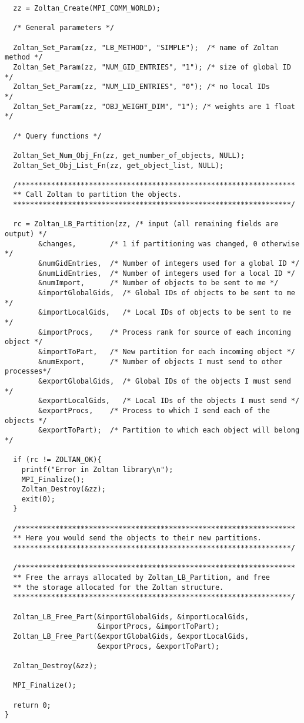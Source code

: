 \begin{flushleft}
\begin{verbatim}
  zz = Zoltan_Create(MPI_COMM_WORLD);

  /* General parameters */

  Zoltan_Set_Param(zz, "LB_METHOD", "SIMPLE");  /* name of Zoltan method */
  Zoltan_Set_Param(zz, "NUM_GID_ENTRIES", "1"); /* size of global ID    */
  Zoltan_Set_Param(zz, "NUM_LID_ENTRIES", "0"); /* no local IDs         */
  Zoltan_Set_Param(zz, "OBJ_WEIGHT_DIM", "1"); /* weights are 1 float   */

  /* Query functions */

  Zoltan_Set_Num_Obj_Fn(zz, get_number_of_objects, NULL);
  Zoltan_Set_Obj_List_Fn(zz, get_object_list, NULL);

  /******************************************************************
  ** Call Zoltan to partition the objects.
  ******************************************************************/

  rc = Zoltan_LB_Partition(zz, /* input (all remaining fields are output) */
        &changes,        /* 1 if partitioning was changed, 0 otherwise */ 
        &numGidEntries,  /* Number of integers used for a global ID */
        &numLidEntries,  /* Number of integers used for a local ID */
        &numImport,      /* Number of objects to be sent to me */
        &importGlobalGids,  /* Global IDs of objects to be sent to me */
        &importLocalGids,   /* Local IDs of objects to be sent to me */
        &importProcs,    /* Process rank for source of each incoming object */
        &importToPart,   /* New partition for each incoming object */
        &numExport,      /* Number of objects I must send to other processes*/
        &exportGlobalGids,  /* Global IDs of the objects I must send */
        &exportLocalGids,   /* Local IDs of the objects I must send */
        &exportProcs,    /* Process to which I send each of the objects */
        &exportToPart);  /* Partition to which each object will belong */

  if (rc != ZOLTAN_OK){
    printf("Error in Zoltan library\n");
    MPI_Finalize();
    Zoltan_Destroy(&zz);
    exit(0);
  }

  /******************************************************************
  ** Here you would send the objects to their new partitions.
  ******************************************************************/

  /******************************************************************
  ** Free the arrays allocated by Zoltan_LB_Partition, and free
  ** the storage allocated for the Zoltan structure.
  ******************************************************************/

  Zoltan_LB_Free_Part(&importGlobalGids, &importLocalGids, 
                      &importProcs, &importToPart);
  Zoltan_LB_Free_Part(&exportGlobalGids, &exportLocalGids, 
                      &exportProcs, &exportToPart);

  Zoltan_Destroy(&zz);

  MPI_Finalize();

  return 0;
}
\end{verbatim}
\end{flushleft}

